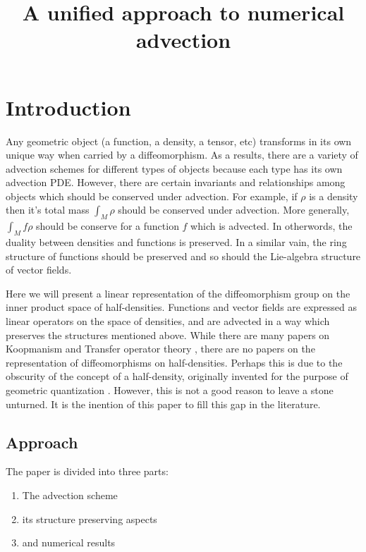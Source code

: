\documentclass[12pt]{amsart}
\title{A unified approach to numerical advection}
\begin{document}
\maketitle

\section{Introduction}
\label{sec:intro}

  Any geometric object (a function, a density, a tensor, etc) transforms in its own unique way when carried by a diffeomorphism.
As a results, there are a variety of advection schemes for different types of
objects because each type has its own advection PDE.
However, there are certain invariants and relationships
among objects which should be conserved under advection.
For example, if $\rho$ is a density then it's total mass $\int_M \rho$
should be conserved under advection.
More generally, $\int_M f \rho$ should be conserve for a function $f$ 
which is advected.
In otherwords, the duality between densities and functions is preserved.
In a similar vain, the ring structure of functions should be preserved
and so should the Lie-algebra structure of vector fields.

Here we will present a linear representation
of the diffeomorphism group on the inner product space of half-densities.
Functions and vector fields are expressed as linear operators on the space of densities, and are advected in a way which preserves the structures mentioned above.
While there are many papers on Koopmanism 
and Transfer operator theory ,
there are no papers on the representation of diffeomorphisms on half-densities.
Perhaps this is due to the obscurity of the concept of a half-density,
originally invented for the purpose of geometric quantization \cite{GulleminSternberg1970}.
However, this is not a good reason to leave a stone unturned.
It is the inention of this paper to fill this gap in the literature.

\subsection{Approach}
\label{sec:approach}
The paper is divided into three parts:
\begin{enumerate}
  \item The advection scheme
  \item its structure preserving aspects
  \item and numerical results
\end{enumerate}
\end{document}
